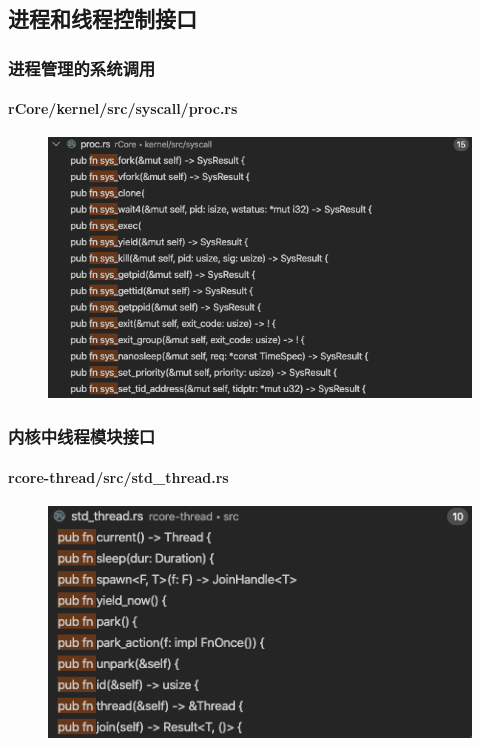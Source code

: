 \subsection{进程和线程控制接口} %
\begin{frame}[fragile]
    \frametitle{进程管理的系统调用}
    \framesubtitle{rCore/kernel/src/syscall/proc.rs}
    \begin{figure}
    \includegraphics[width=0.7\linewidth]{figs/proc-syscall.png}
    \end{figure}

\end{frame}
% 
% 
% 
% 
% 
\begin{frame}[fragile]
    \frametitle{内核中线程模块接口}
    \framesubtitle{rcore-thread/src/std\_thread.rs}
    \begin{figure}
    \includegraphics[width=0.7\linewidth]{figs/rcore-thread.png}
    \end{figure}

\end{frame}
% 
% 
% 
% 
% 

